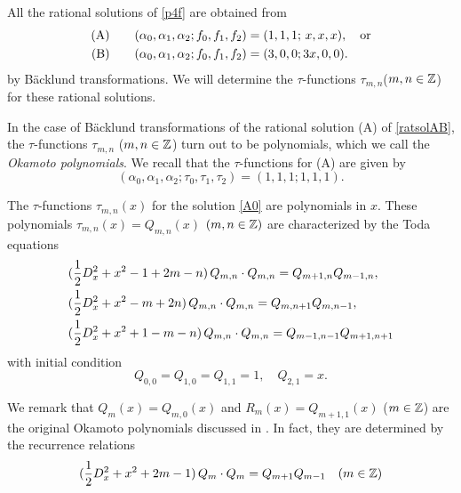 All the rational solutions of \eqref{p4f} are obtained from 
\begin{equation}
\begin{align} \label{ratsolAB}
\mbox{(A)} &\qquad(\alpha_0,\alpha_1,\alpha_2; f_0,f_1,f_2) 
= (1,1,1;\, x,x,x), \quad\mbox{or} \\
\mbox{(B)} &\qquad(\alpha_0,\alpha_1,\alpha_2; f_0,f_1,f_2) = (3,0,0; 3x,0,0).\notag
\end{align}
\end{equation}
by B\"acklund transformations.  
We will determine the $\tau$-functions $\tau_{m,n}$($m,n\in{\Bbb Z}$) 
for these rational solutions.  
\par\medskip
In the case of B\"acklund transformations of the rational 
solution (A) of \eqref{ratsolAB}, 
the $\tau$-functions $\tau_{m,n}$ ($m,n\in{\Bbb Z}$) turn out to be polynomials, 
which we call the {\em Okamoto polynomials}.
We recall that the $\tau$-functions for (A) are given by
\begin{equation}\label{A0}
(\alpha_0,\alpha_1,\alpha_2; \tau_0,\tau_1,\tau_2)=
(1,1,1; 1,1,1). 
\end{equation}
\begin{thm} \label{Thm42}
The $\tau$-functions $\tau_{m,n}(x)$ for the solution \eqref{A0}
are polynomials in $x$.  
These polynomials $\tau_{m,n}(x)=Q_{m,n}(x)$ $(m,n\in{\Bbb Z})$
are characterized by the Toda equations
\begin{equation}
\begin{align}
&(\frac{1}{2}D_x^2+x^2-1+2m-n)\, 
Q_{m,n}\cdot Q_{m,n}=Q_{m+1,n}Q_{m-1,n},\notag\\
&(\frac{1}{2}D_x^2+x^2-m+2n)\, 
Q_{m,n}\cdot Q_{m,n}=Q_{m,n+1} Q_{m,n-1},\\
&(\frac{1}{2}D_x^2+x^2+1-m-n)\, 
Q_{m,n}\cdot Q_{m,n}=Q_{m-1,n-1} Q_{m+1,n+1}\notag
\end{align}
\end{equation}
with initial condition
\begin{equation}
Q_{0,0}=Q_{1,0}=Q_{1,1}=1, \quad
Q_{2,1}=x. 
\end{equation}
\end{thm}
\medskip\noindent
We remark that $Q_m(x)=Q_{m,0}(x)$ and $R_{m}(x)=Q_{m+1,1}(x)$ 
($m\in {\Bbb Z}$) are the 
original Okamoto polynomials discussed in \cite{FOU}. 
In fact, they are determined by the recurrence relations
\begin{equation}
(\frac{1}{2}D_x^2+x^2+2m-1)\, 
Q_{m}\cdot Q_{m}=Q_{m+1}Q_{m-1}\quad (m\in{\Bbb Z})
\end{equation}
